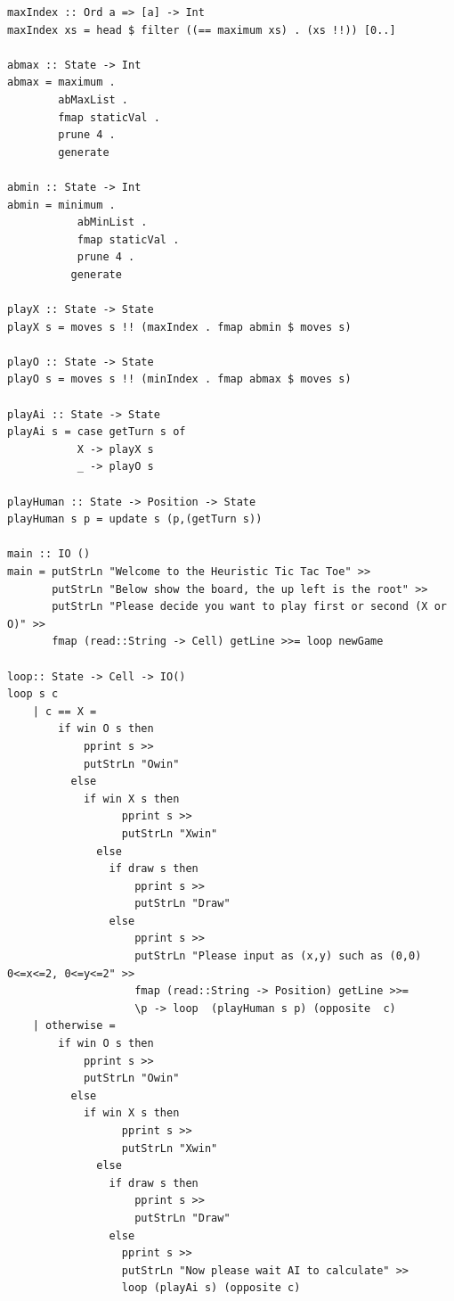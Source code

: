 \documentclass[titlepage]{article}
\begin{document}
\begin{verbatim}
maxIndex :: Ord a => [a] -> Int
maxIndex xs = head $ filter ((== maximum xs) . (xs !!)) [0..]

abmax :: State -> Int
abmax = maximum .
        abMaxList .
        fmap staticVal .
        prune 4 .
        generate

abmin :: State -> Int
abmin = minimum .
           abMinList .
           fmap staticVal .
           prune 4 .
          generate

playX :: State -> State
playX s = moves s !! (maxIndex . fmap abmin $ moves s)

playO :: State -> State
playO s = moves s !! (minIndex . fmap abmax $ moves s)

playAi :: State -> State
playAi s = case getTurn s of
           X -> playX s
           _ -> playO s

playHuman :: State -> Position -> State
playHuman s p = update s (p,(getTurn s))

main :: IO ()
main = putStrLn "Welcome to the Heuristic Tic Tac Toe" >>
       putStrLn "Below show the board, the up left is the root" >>
       putStrLn "Please decide you want to play first or second (X or O)" >>
       fmap (read::String -> Cell) getLine >>= loop newGame

loop:: State -> Cell -> IO()
loop s c
    | c == X =
        if win O s then
            pprint s >>
            putStrLn "Owin"
          else
            if win X s then
                  pprint s >>
                  putStrLn "Xwin"
              else
                if draw s then
                    pprint s >>
                    putStrLn "Draw"
                else
                    pprint s >>
                    putStrLn "Please input as (x,y) such as (0,0) 0<=x<=2, 0<=y<=2" >>
                    fmap (read::String -> Position) getLine >>=
                    \p -> loop  (playHuman s p) (opposite  c)
    | otherwise =
        if win O s then
            pprint s >>
            putStrLn "Owin"
          else
            if win X s then
                  pprint s >>
                  putStrLn "Xwin"
              else
                if draw s then
                    pprint s >>
                    putStrLn "Draw"
                else
                  pprint s >>
                  putStrLn "Now please wait AI to calculate" >>
                  loop (playAi s) (opposite c)
\end{verbatim}
\end{document}
